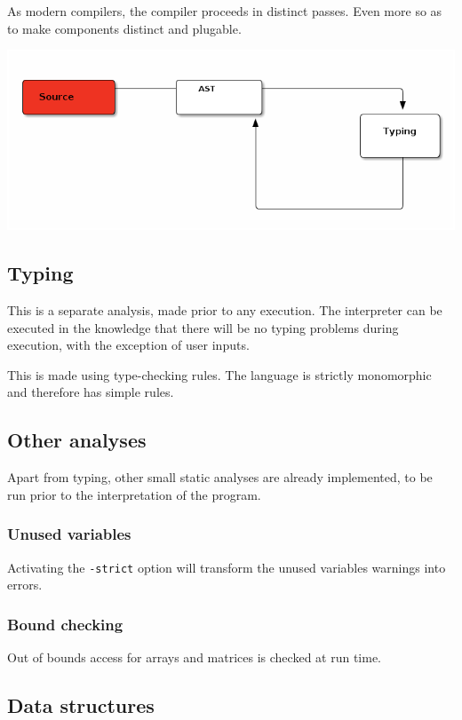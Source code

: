 \documentclass[11pt]{article}
\begin{document}
As modern compilers, the compiler proceeds in distinct passes. Even more so
as to make components distinct and plugable.

\includegraphics[width=.9\linewidth]{img/phases.png}

\subsection{Typing}
\label{sec-5-2}

This is a separate analysis, made prior to any execution. The interpreter can
be executed in the knowledge that there will be no typing problems during
execution, with the exception of user inputs.

This is made using type-checking rules. The language is strictly
monomorphic and therefore has simple rules.



\subsection{Other analyses}
\label{sec-5-3}

Apart from typing, other small static analyses are already implemented, to be
run prior to the interpretation of the program.


\subsubsection{Unused variables}
\label{sec-5-3-1}

Activating the \texttt{-strict} option will transform the unused variables warnings
into errors.

\subsubsection{Bound checking}
\label{sec-5-3-2}

Out of bounds access for arrays and matrices is checked at run time.

\subsection{Data structures}
\label{sec-5-4}
\end{document}

